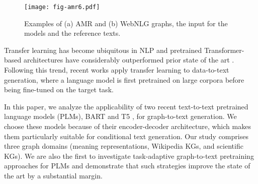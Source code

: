 \documentclass[11pt,a4paper]{article}
\begin{document}
 \begin{figure*}[t]
    \centering
    \texttt{[image: fig-amr6.pdf]}
    \caption{Examples of (a) AMR and (b) WebNLG graphs, the input for the models and the reference texts.}
    \label{fig:graphs}
\end{figure*}


Transfer learning has become ubiquitous in NLP and pretrained Transformer-based architectures have considerably outperformed prior state of the art \cite{devlin-etal-2019-bert, liu2020roberta, radford2019language}. Following this trend, recent works \cite{mager2020gpttoo, harkous2020text} apply transfer learning to data-to-text generation, where a language model is first pretrained on large corpora before being fine-tuned on the target task. 



In this paper, we analyze the applicability of two recent text-to-text pretrained language models (PLMs), BART \cite{lewis2019bart} and T5 \cite{2019t5}, for graph-to-text generation. We choose these models because of their encoder-decoder architecture, which makes them particularly suitable for conditional text generation. Our study comprises three graph domains (meaning representations, Wikipedia KGs, and scientific KGs). We are also the first to investigate task-adaptive graph-to-text pretraining approaches for PLMs and demonstrate that such strategies improve the state of the art by a substantial margin.
\end{document}
